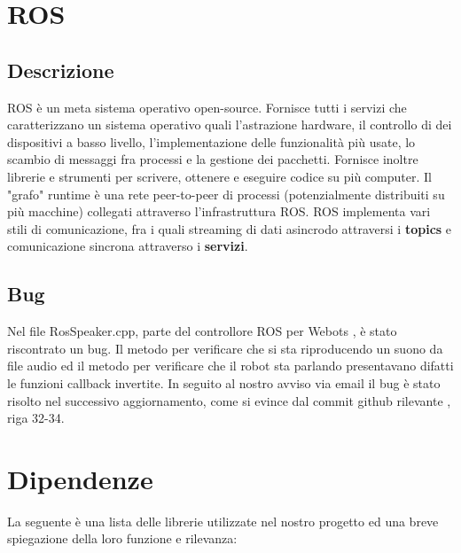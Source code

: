 \documentclass[a4paper]{article}
\begin{document}
	\section{ROS}\label{sec:Ros}
	
	\subsection{Descrizione}\label{sec:Descrizione}
	ROS \cite{ros.org} è un meta sistema operativo open-source. Fornisce tutti i servizi che caratterizzano un sistema operativo quali l'astrazione hardware, il controllo di dei dispositivi a basso livello, l'implementazione delle funzionalità più usate, lo scambio di messaggi fra processi e la gestione dei pacchetti. Fornisce inoltre librerie e strumenti per scrivere, ottenere e eseguire codice su più computer. Il "grafo" runtime è una rete peer-to-peer di processi (potenzialmente distribuiti su più macchine) collegati attraverso l'infrastruttura ROS. ROS implementa vari stili di comunicazione, fra i quali streaming di dati asincrodo attraversi i \textbf{topics} e comunicazione sincrona attraverso i \textbf{servizi}. 
	
	\subsection{Bug}\label{sec:Bug}
	Nel file RosSpeaker.cpp, parte del controllore ROS per Webots \cite{cyberbotics}, è stato riscontrato un bug. Il metodo per verificare che si sta riproducendo un suono da file audio ed il metodo per verificare che il robot sta parlando presentavano difatti le funzioni callback invertite. In seguito al nostro avviso via email il bug è stato risolto nel successivo aggiornamento, come si evince dal commit github rilevante \cite{rosbug}, riga 32-34.
	
	\section{Dipendenze}\label{sec:Dipendenze} 
	La seguente è una lista delle librerie utilizzate nel nostro progetto ed una breve spiegazione della loro funzione e rilevanza:
	
\end{document}
